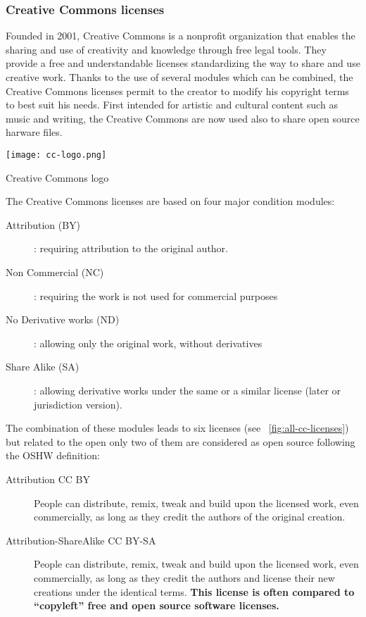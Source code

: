 \subsubsection{Creative Commons licenses} %
\begin{row}{4}{2}
    \begin{cell}{3}
        Founded in 2001, Creative Commons is a nonprofit organization that enables the sharing and use of creativity and knowledge through free legal tools. They provide a free and understandable licenses standardizing the way to share and use creative work. Thanks to the use of several modules which can be combined, the Creative Commons licenses permit to the creator to modify his copyright terms to best suit his needs. First intended for artistic and cultural content such as music and writing, the Creative Commons are now used also to share open source harware files.
    \end{cell}
    \begin{cell}{1}
        \begin{NFfigure}
            \centering
                \texttt{[image: cc-logo.png]}
            \caption{Creative Commons logo}
            \label{fig:cc_logo}
        \end{NFfigure}
    \end{cell}
\end{row}
The Creative Commons licenses are based on four major condition modules:
\begin{description}
    \item[Attribution (BY)]: requiring attribution to the original author.
    \item[Non Commercial (NC)]: requiring the work is not used for commercial purposes
    \item[No Derivative works (ND)]: allowing only the original work, without derivatives
    \item[Share Alike (SA)]: allowing derivative works under the same or a similar license (later or jurisdiction version).
\end{description}


The combination of these modules leads to six licenses (see \figurename~\ref{fig:all-cc-licenses}) but related to the open only two of them are considered as open source following the OSHW definition:
\begin{description}
    \item[Attribution CC BY] People can distribute, remix, tweak and build upon the licensed work, even commercially, as long as they credit the authors of the original creation.
    \item[Attribution-ShareAlike CC BY-SA] People can distribute, remix, tweak and build upon the licensed work, even commercially, as long as they credit the authors and license their new creations under the identical terms. \textbf{This license is often compared to “copyleft” free and open source software licenses.}
\end{description}

